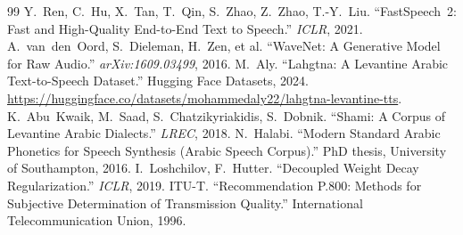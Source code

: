 \documentclass[10pt,twocolumn]{article}
\begin{document}
{\begin{thebibliography}{99}
 Y.~Ren, C.~Hu, X.~Tan, T.~Qin, S.~Zhao, Z.~Zhao, T.-Y.~Liu.
``FastSpeech~2: Fast and High-Quality End-to-End Text to Speech.'' \emph{ICLR}, 2021.
 A.~van~den~Oord, S.~Dieleman, H.~Zen, et al. ``WaveNet: A Generative Model
for Raw Audio.'' \emph{arXiv:1609.03499}, 2016.
 M.~Aly. ``Lahgtna: A Levantine Arabic Text-to-Speech Dataset.''
Hugging Face Datasets, 2024. \url{https://huggingface.co/datasets/mohammedaly22/lahgtna-levantine-tts}.
 K.~Abu~Kwaik, M.~Saad, S.~Chatzikyriakidis, S.~Dobnik. ``Shami: A Corpus of
Levantine Arabic Dialects.'' \emph{LREC}, 2018.
 N.~Halabi. ``Modern Standard Arabic Phonetics for Speech Synthesis
(Arabic Speech Corpus).'' PhD thesis, University of Southampton, 2016.
 I.~Loshchilov, F.~Hutter. ``Decoupled Weight Decay Regularization.''
\emph{ICLR}, 2019.
 ITU-T. ``Recommendation P.800: Methods for Subjective Determination of
Transmission Quality.'' International Telecommunication Union, 1996.
\end{thebibliography}
}
\end{document}
